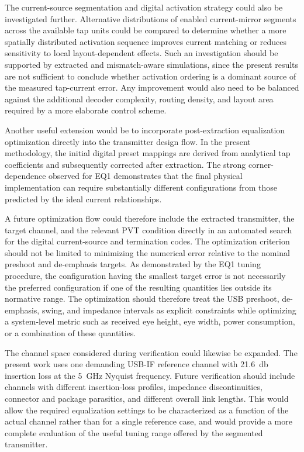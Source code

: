 The current-source segmentation and digital activation strategy could also be investigated further. Alternative distributions of enabled current-mirror segments across the available tap units could be compared to determine whether a more spatially distributed activation sequence improves current matching or reduces sensitivity to local layout-dependent effects. Such an investigation should be supported by extracted and mismatch-aware simulations, since the present results are not sufficient to conclude whether activation ordering is a dominant source of the measured tap-current error. Any improvement would also need to be balanced against the additional decoder complexity, routing density, and layout area required by a more elaborate control scheme.

Another useful extension would be to incorporate post-extraction equalization optimization directly into the transmitter design flow. In the present methodology, the initial digital preset mappings are derived from analytical tap coefficients and subsequently corrected after extraction. The strong corner-dependence observed for EQ1 demonstrates that the final physical implementation can require substantially different configurations from those predicted by the ideal current relationships.

A future optimization flow could therefore include the extracted transmitter, the target channel, and the relevant \ac{PVT} condition directly in an automated search for the digital current-source and termination codes. The optimization criterion should not be limited to minimizing the numerical error relative to the nominal preshoot and de-emphasis targets. As demonstrated by the EQ1 tuning procedure, the configuration having the smallest target error is not necessarily the preferred configuration if one of the resulting quantities lies outside its normative range. The optimization should therefore treat the \ac{USB} preshoot, de-emphasis, swing, and impedance intervals as explicit constraints while optimizing a system-level metric such as received eye height, eye width, power consumption, or a combination of these quantities.

The channel space considered during verification could likewise be expanded. The present work uses one demanding \ac{USB-IF} reference channel with \SI{21.6}{\decibel} insertion loss at the \SI{5}{\giga\hertz} Nyquist frequency. Future verification should include channels with different insertion-loss profiles, impedance discontinuities, connector and package parasitics, and different overall link lengths. This would allow the required equalization settings to be characterized as a function of the actual channel rather than for a single reference case, and would provide a more complete evaluation of the useful tuning range offered by the segmented transmitter.


